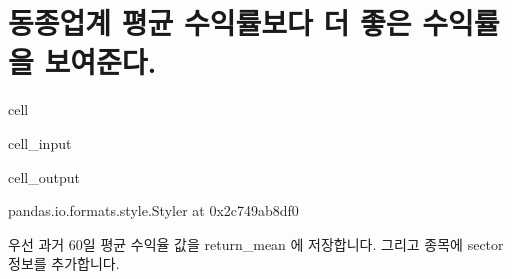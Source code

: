 \documentclass[letterpaper,10pt,english]{jupyterBook}
\begin{document}
\part{동종업계 평균 수익률보다 더 좋은 수익률을 보여준다.}
\label{\detokenize{chapter5/5.1.6_Hypothesis_6:id1}}\label{\detokenize{chapter5/5.1.6_Hypothesis_6::doc}}
\begin{sphinxuseclass}{cell}\begin{sphinxVerbatimInput}

\begin{sphinxuseclass}{cell_input}
\begin{sphinxVerbatim}[commandchars=\\\{\}]
  
\end{sphinxVerbatim}

\end{sphinxuseclass}\end{sphinxVerbatimInput}
\begin{sphinxVerbatimOutput}

\begin{sphinxuseclass}{cell_output}
\begin{sphinxVerbatim}[commandchars=\\\{\}]
\PYGZlt{}pandas.io.formats.style.Styler at 0x2c749ab8df0\PYGZgt{}
\end{sphinxVerbatim}

\end{sphinxuseclass}\end{sphinxVerbatimOutput}

\end{sphinxuseclass}
\sphinxAtStartPar
 우선 과거 60일 평균 수익율 값을 return\_mean 에 저장합니다. 그리고 종목에 sector 정보를 추가합니다.
\end{document}
